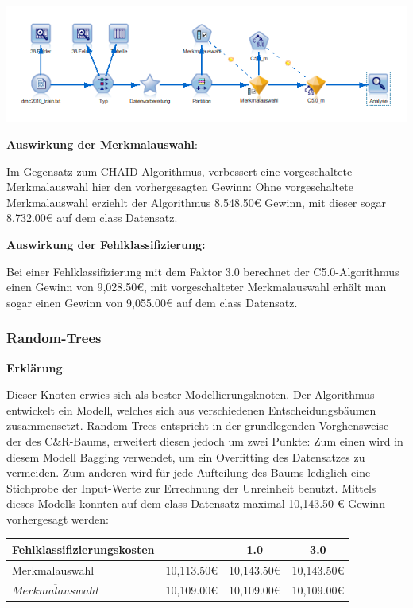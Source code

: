 \documentclass[a4paper,12pt]{article}
\newcounter{Algorithmus}
\begin{document}
\begin{center}
\includegraphics[width=\textwidth]{Screens/c50_m}
\end{center}

{\bf Auswirkung der Merkmalauswahl}:
\par
Im Gegensatz zum CHAID-Algorithmus, verbessert eine vorgeschaltete Merkmalauswahl hier den vorhergesagten Gewinn: Ohne vorgeschaltete Merkmalauswahl erziehlt der Algorithmus 8,548.50\;\euro\; Gewinn, mit dieser sogar 8,732.00\;\euro\; auf dem class Datensatz.
\par
\vspace{0.2cm}

{\bf Auswirkung der Fehlklassifizierung:}
\par
 Bei einer Fehlklassifizierung mit dem Faktor 3.0 berechnet der C5.0-Algorithmus einen Gewinn von 9,028.50\;\euro,\; mit vorgeschalteter Merkmalauswahl erhält man sogar einen Gewinn von 9,055.00\;\euro\; auf dem class Datensatz.

\subsubsection{Random-Trees}
{\bf Erklärung}:
\par
\vspace{0.2cm}
Dieser Knoten erwies sich als bester Modellierungsknoten.
Der Algorithmus entwickelt ein Modell, welches sich aus verschiedenen Entscheidungsbäumen zusammensetzt.
Random Trees entspricht in der grundlegenden Vorghensweise der des C\&R-Baums, erweitert
diesen jedoch um zwei Punkte: Zum einen wird in diesem Modell Bagging verwendet, um
ein Overfitting des Datensatzes zu vermeiden. Zum anderen wird für jede Aufteilung des Baums
lediglich eine Stichprobe der Input-Werte zur Errechnung der Unreinheit benutzt.
Mittels dieses Modells konnten auf dem class Datensatz maximal 10,143.50 \euro\;  Gewinn vorhergesagt werden:

\begin{center}
	\begin{tabular}{l | c | c | c}
	
	Fehlklassifizierungskosten & -- &  1.0 &  3.0
	\\
	\hline
	Merkmalauswahl  & 10,113.50\;\euro  & 10,143.50\;\euro & 10,143.50\;\euro
	\\
	$\overline{Merkmalauswahl}$  & 10,109.00\;\euro &  10,109.00\;\euro & 10,109.00\;\euro
	
	\end{tabular}
\end{center}
\end{document}
